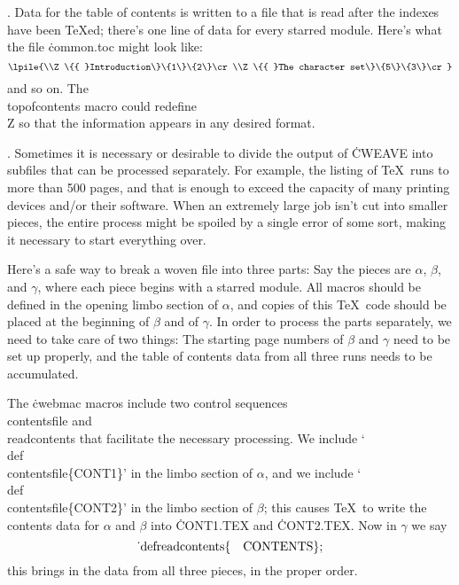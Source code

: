 {{{{{{. Data for the table of contents is written to a file that
is read after the indexes have been \TeX ed; there's one line of data
for every starred module. Here's what the
file \.{common.toc} might look like:
$$\lpile{\\Z \{{ }Introduction\}\{1\}\{2\}\cr
  \\Z \{{ }The character set\}\{5\}\{3\}\cr}$$
and so on. The \.{\\topofcontents} macro could
redefine \.{\\Z} so that the information appears in any desired format.

. Sometimes it is necessary or desirable to divide the output of
\.{CWEAVE} into subfiles that can be processed separately. For example,
the listing of \TeX\ runs to more than 500 pages, and that is enough to
exceed the capacity of many printing devices and/or their software.
When an extremely large job isn't cut into smaller pieces, the entire
process might be spoiled by a single error of some sort, making it
necessary to start everything over.

Here's a safe way to break a woven file into three parts:
Say the pieces are $\alpha$,
$\beta$, and $\gamma$, where each piece begins with a starred module.
All macros should be defined in the opening limbo section of $\alpha$,
and copies of this \TeX\ code should be placed at the
beginning of $\beta$ and of $\gamma$. In order to process the parts
separately, we need to take care of two things: The starting page
numbers of $\beta$ and $\gamma$ need to be set up properly, and
the table of contents data from all three runs needs to be
accumulated.

The \.{cwebmac} macros include two control sequences \.{\\contentsfile} and
\.{\\readcontents} that facilitate the necessary processing.  We include
`\.{\\def\\contentsfile\{CONT1\}}' in the limbo section of $\alpha$, and
we include `\.{\\def\\contentsfile\{CONT2\}}' in the limbo section of
$\beta$; this causes \TeX\ to write the contents data for $\alpha$ and $\beta$
into \.{CONT1.TEX} and \.{CONT2.TEX}. Now in $\gamma$ we say
$$\hbox{\.{\\def\\readcontents\{\ \ \
CONTENTS\}};}$$
this brings in the data from all three pieces, in the proper order.

}}}}}}
